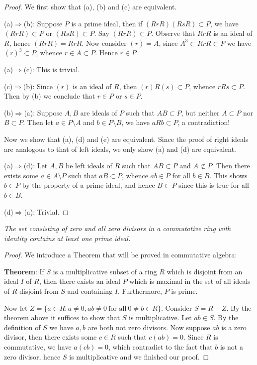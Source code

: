 \begin{proof}
We first show that (a), (b) and (c) are equivalent.\par
(a)$\Rightarrow$(b): Suppose $P$ is a prime ideal, then if $(RrR)(RsR)\subset P$, we have $(RrR)\subset P$ or $(RsR)\subset P$. Say $(RrR)\subset P$. Observe that $RrR$ is an ideal of $R$, hence $(RrR)=RrR$. Now consider $(r)=A$, since $A^3\subset RrR\subset P$ we have $(r)^3\subset P$, whence $r\in A\subset P$. Hence $r\in P$.\par
(a)$\Rightarrow$(c): This is trivial.\par
(c)$\Rightarrow$(b): Since $(r)$ is an ideal of $R$, then $(r)R(s)\subset P$, whence $rRs\subset P$. Then by (b) we conclude that $r\in P$ or $s\in P$.\par
(b)$\Rightarrow$(a): Suppose $A,B$ are ideals of $P$ such that $AB\subset P$, but neither $A\subset P$ nor $B\subset P$. Then let $a\in P\setminus A$ and $b\in P\setminus B$, we have $aRb\subset P$, a contradiction!\par
Now we show that (a), (d) and (e) are equivalent. Since the proof of right ideals are analogous to that of left ideals, we only show (a) and (d) are equivalent.\par
(a)$\Rightarrow$(d): Let $A,B$ be left ideals of $R$ such that $AB\subset P$ and $A\not\subset P$. Then there exists some $a\in A\setminus P$ such that $aB\subset P$, whence $ab\in P$ for all $b\in B$. This shows $b\in P$ by the property of a prime ideal, and hence $B\subset P$ since this is true for all $b\in B$.\par
(d)$\Rightarrow$(a): Trivial.
\end{proof}
\begin{problem}\em
The set consisting of zero and all zero divisors in a commutative ring with identity contains at least one prime ideal.
\end{problem}
\begin{proof}
We introduce a Theorem that will be proved in commutative algebra:\par
\textbf{Theorem}: If $S$ is a multiplicative subset of a ring $R$ which is disjoint from an ideal $I$ of $R$, then there exists an ideal $P$ which is maximal in the set of all ideals of $R$ disjoint from $S$ and containing $I$. Furthermore, $P$ is prime.\par
Now let $Z=\{a\in R:a\ne0,ab\ne 0\ \text{for all}\ 0\ne b\in R\}$. Consider $S=R-Z$. By the theorem above it suffices to show that $S$ is multiplicative. Let $ab\in S$. By the definition of $S$ we have $a,b$ are both not zero divisors. Now suppose $ab$ is a zero divisor, then there exists some $c\in R$ such that $c(ab)=0$. Since $R$ is commutative, we have $a(cb)=0$, which contradict to the fact that $b$ is not a zero divisor, hence $S$ is multiplicative and we finished our proof.
\end{proof}
